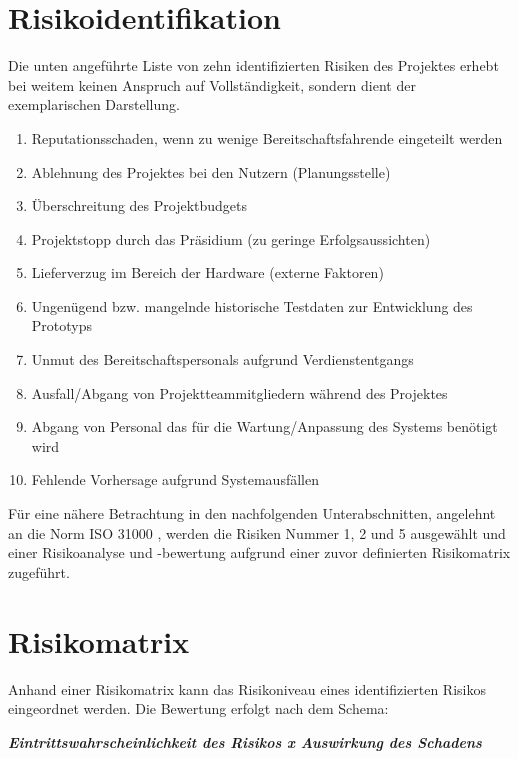 \section{Risikoidentifikation}

Die unten angeführte Liste von zehn identifizierten Risiken des Projektes erhebt bei weitem keinen Anspruch auf Vollständigkeit, sondern dient der exemplarischen Darstellung. 

\begin{enumerate}
	\itemsep-8pt
	\item Reputationsschaden, wenn zu wenige Bereitschaftsfahrende eingeteilt werden
  	\item Ablehnung des Projektes bei den Nutzern (Planungsstelle)
 	\item Überschreitung des Projektbudgets
 	\item Projektstopp durch das Präsidium (zu geringe Erfolgsaussichten)
 	\item Lieferverzug im Bereich der Hardware (externe Faktoren)
 	\item Ungenügend bzw. mangelnde historische Testdaten zur Entwicklung des Prototyps
 	\item Unmut des Bereitschaftspersonals aufgrund Verdienstentgangs
 	\item Ausfall/Abgang von Projektteammitgliedern während des Projektes
 	\item Abgang von Personal das für die Wartung/Anpassung des Systems benötigt wird
 	\item Fehlende Vorhersage aufgrund Systemausfällen
\end{enumerate}

Für eine nähere Betrachtung in den nachfolgenden Unterabschnitten, angelehnt an die Norm ISO 31000 \citep{wikipedia_iso_2024},  werden die Risiken Nummer 1, 2 und 5 ausgewählt und einer Risikoanalyse und -bewertung aufgrund einer zuvor definierten Risikomatrix zugeführt.

\section{Risikomatrix}

Anhand einer Risikomatrix kann das Risikoniveau eines identifizierten Risikos eingeordnet werden. Die Bewertung erfolgt nach dem Schema: 

\begin{center}
\textbf{\textit{\textbf{Eintrittswahrscheinlichkeit des Risikos} x \textbf{Auswirkung des Schadens}} }
\end{center}

